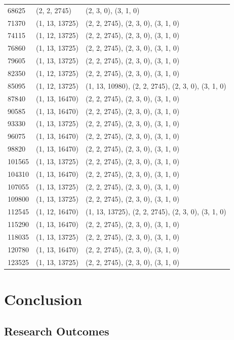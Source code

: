 \documentclass[oneside]{utmthesis}
\begin{document}
\begin{center}
\begin{longtable}{|l|l|l|}
68625 & (2, 2, 2745) & (2, 3, 0), (3, 1, 0) \\
71370 & (1, 13, 13725) & (2, 2, 2745), (2, 3, 0), (3, 1, 0) \\
74115 & (1, 12, 13725) & (2, 2, 2745), (2, 3, 0), (3, 1, 0) \\
76860 & (1, 13, 13725) & (2, 2, 2745), (2, 3, 0), (3, 1, 0) \\
79605 & (1, 13, 13725) & (2, 2, 2745), (2, 3, 0), (3, 1, 0) \\
82350 & (1, 12, 13725) & (2, 2, 2745), (2, 3, 0), (3, 1, 0) \\
85095 & (1, 12, 13725) & (1, 13, 10980), (2, 2, 2745), (2, 3, 0), (3, 1, 0) \\
87840 & (1, 13, 16470) & (2, 2, 2745), (2, 3, 0), (3, 1, 0) \\
90585 & (1, 13, 16470) & (2, 2, 2745), (2, 3, 0), (3, 1, 0) \\
93330 & (1, 13, 13725) & (2, 2, 2745), (2, 3, 0), (3, 1, 0) \\
96075 & (1, 13, 16470) & (2, 2, 2745), (2, 3, 0), (3, 1, 0) \\
98820 & (1, 13, 16470) & (2, 2, 2745), (2, 3, 0), (3, 1, 0) \\
101565 & (1, 13, 13725) & (2, 2, 2745), (2, 3, 0), (3, 1, 0) \\
104310 & (1, 13, 16470) & (2, 2, 2745), (2, 3, 0), (3, 1, 0) \\
107055 & (1, 13, 13725) & (2, 2, 2745), (2, 3, 0), (3, 1, 0) \\
109800 & (1, 13, 13725) & (2, 2, 2745), (2, 3, 0), (3, 1, 0) \\
112545 & (1, 12, 16470) & (1, 13, 13725), (2, 2, 2745), (2, 3, 0), (3, 1, 0) \\
115290 & (1, 13, 16470) & (2, 2, 2745), (2, 3, 0), (3, 1, 0) \\
118035 & (1, 13, 13725) & (2, 2, 2745), (2, 3, 0), (3, 1, 0) \\
120780 & (1, 13, 16470) & (2, 2, 2745), (2, 3, 0), (3, 1, 0) \\
123525 & (1, 13, 13725) & (2, 2, 2745), (2, 3, 0), (3, 1, 0) \\
\end{longtable}
\end{center}

\chapter{Conclusion}
\section{Research Outcomes}
\end{document}
